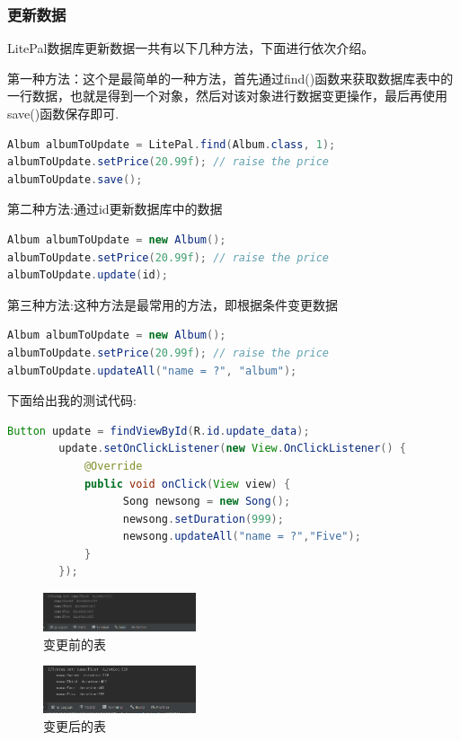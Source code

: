 \documentclass[cs4size,a4paper]{ctexart}
\numberwithin{equation}{section}
\numberwithin{table}{section}
\numberwithin{figure}{section}
\begin{document}
\subsubsection{更新数据}
LitePal数据库更新数据一共有以下几种方法，下面进行依次介绍。

第一种方法：这个是最简单的一种方法，首先通过find()函数来获取数据库表中的一行数据，也就是得到一个对象，然后对该对象进行数据变更操作，最后再使用save()函数保存即可.
\begin{lstlisting}[language=java]
Album albumToUpdate = LitePal.find(Album.class, 1);
albumToUpdate.setPrice(20.99f); // raise the price
albumToUpdate.save();
\end{lstlisting}

第二种方法:通过id更新数据库中的数据
\begin{lstlisting}[language=java]
Album albumToUpdate = new Album();
albumToUpdate.setPrice(20.99f); // raise the price
albumToUpdate.update(id);
\end{lstlisting}

第三种方法:这种方法是最常用的方法，即根据条件变更数据
\begin{lstlisting}[language=java]
Album albumToUpdate = new Album();
albumToUpdate.setPrice(20.99f); // raise the price
albumToUpdate.updateAll("name = ?", "album");
\end{lstlisting}
下面给出我的测试代码:
\begin{lstlisting}[language=java]
        Button update = findViewById(R.id.update_data);
        update.setOnClickListener(new View.OnClickListener() {
            @Override
            public void onClick(View view) {
                  Song newsong = new Song();
                  newsong.setDuration(999);
                  newsong.updateAll("name = ?","Five");
            }
        });
\end{lstlisting}
\begin{figure}[H]
\small
\centering
\includegraphics[width=0.4\textwidth]{update}
\caption{变更前的表} \label{变更前的表}
\end{figure}
\begin{figure}[H]
\small
\centering
\includegraphics[width=0.4\textwidth]{update1}
\caption{变更后的表} \label{变更后的表}
\end{figure}
\end{document}
